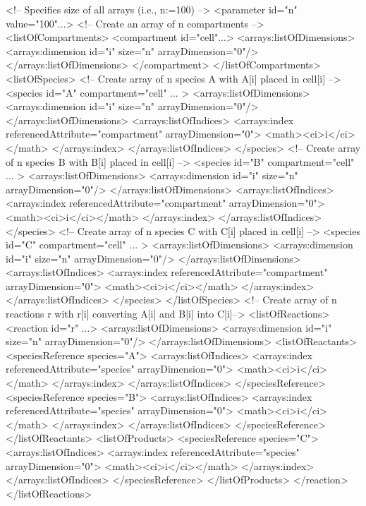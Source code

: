 \begin{example}
<!-- Specifies size of all arrays (i.e., n:=100) -->
<parameter id="n" value="100"...>
<!-- Create an array of n compartments -->
<listOfCompartments> 
 <compartment id="cell"...>
  <arrays:listOfDimensions>
   <arrays:dimension id="i" size="n" arrayDimension="0"/>
  </arrays:listOfDimensions>
 </compartment>
</listOfCompartments> 
<listOfSpecies>
 <!-- Create array of n species A with A[i] placed in cell[i] -->
 <species id="A" compartment="cell" ... > 
  <arrays:listOfDimensions>
   <arrays:dimension id="i" size="n" arrayDimension="0"/>
  </arrays:listOfDimensions>
  <arrays:listOfIndices>
   <arrays:index referencedAttribute="compartment" arrayDimension="0">
    <math><ci>i</ci></math>
   </arrays:index>
  </arrays:listOfIndices>
 </species>
 <!-- Create array of n species B with B[i] placed in cell[i] -->
 <species id="B" compartment="cell" ... > 
  <arrays:listOfDimensions>
   <arrays:dimension id="i" size="n" arrayDimension="0"/>
  </arrays:listOfDimensions>
  <arrays:listOfIndices>
   <arrays:index referencedAttribute="compartment" arrayDimension="0">
    <math><ci>i</ci></math>
   </arrays:index>
  </arrays:listOfIndices>
 </species>
 <!-- Create array of n species C with C[i] placed in cell[i] -->
 <species id="C" compartment="cell" ... >
  <arrays:listOfDimensions>
   <arrays:dimension id="i" size="n" arrayDimension="0"/>
  </arrays:listOfDimensions>
  <arrays:listOfIndices>
   <arrays:index referencedAttribute="compartment" arrayDimension="0">
    <math><ci>i</ci></math>
   </arrays:index>
  </arrays:listOfIndices>
 </species>
</listOfSpecies>
<!-- Create array of n reactions r with r[i] converting A[i] and B[i] into C[i]-->
<listOfReactions>
 <reaction id="r" ...> 
  <arrays:listOfDimensions>
   <arrays:dimension id="i" size="n" arrayDimension="0"/>
  </arrays:listOfDimensions>
  <listOfReactants>
   <speciesReference species="A">
    <arrays:listOfIndices>
     <arrays:index referencedAttribute="species" arrayDimension="0">
      <math><ci>i</ci></math>
     </arrays:index>
    </arrays:listOfIndices>
   </speciesReference>
   <speciesReference species="B"> 
    <arrays:listOfIndices>
     <arrays:index referencedAttribute="species" arrayDimension="0">
      <math><ci>i</ci></math>
     </arrays:index>
    </arrays:listOfIndices>
   </speciesReference>
  </listOfReactants> 
  <listOfProducts>
   <speciesReference species="C"> 
    <arrays:listOfIndices>
     <arrays:index referencedAttribute="species" arrayDimension="0">
      <math><ci>i</ci></math>
     </arrays:index>
    </arrays:listOfIndices>
   </speciesReference>
  </listOfProducts>
 </reaction>
</listOfReactions>
\end{example}

